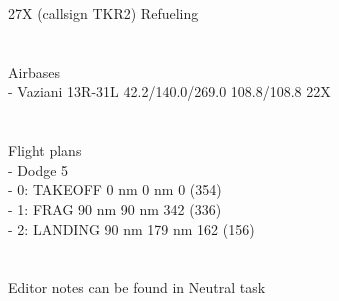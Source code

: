 \documentclass{article}
\begin{document}
27X (callsign TKR2)    Refueling\\
\\
\\
Airbases\\
- Vaziani    13R-31L    42.2/140.0/269.0    108.8/108.8    22X\\
 \\
\\
Flight plans\\
-     Dodge 5    \\
- 0: TAKEOFF    0 nm    0 nm    0 (354)\\
- 1: FRAG    90 nm    90 nm    342 (336)\\
- 2: LANDING    90 nm    179 nm    162 (156)\\
\\
\\
Editor notes can be found in Neutral task\\


                    
\end{document}
